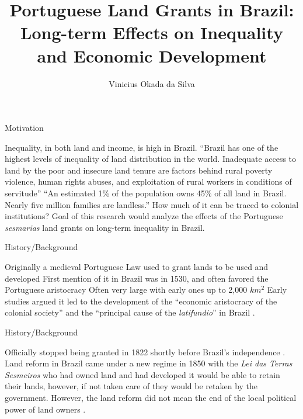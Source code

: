 \documentclass[aspectratio=1610, handout]{beamer}
\title{Portuguese Land Grants in Brazil: Long-term Effects on Inequality and Economic Development}
\author{Vinicius Okada da Silva}
\institute{The University of Illinois at Urbana-Champaign}
\date{}
\begin{document}
\begin{frame}
	\titlepage
\end{frame}

\begin{frame}{Motivation}
    \begin{outline}
        \1 Inequality, in both land and income, is high in Brazil.
            \2 ``Brazil has one of the highest levels of inequality of land distribution in the world. Inadequate access to land by the poor and insecure land tenure are factors behind rural poverty violence, human rights abuses, and exploitation of rural workers in conditions of servitude'' \parencite{Usaid2016-xs}
            \2 ``An estimated 1\% of the population owns 45\% of all land in Brazil. Nearly five million families are landless.'' \parencite{Usaid2016-xs}
        \pause 
        \1 How much of it can be traced to colonial institutions?
            \2 Goal of this research would analyze the effects of the Portuguese \textit{sesmarias} land grants on long-term inequality in Brazil.
    \end{outline}
\end{frame}

\begin{frame}{History/Background}
    \begin{outline}
        \1 Originally a medieval Portuguese Law used to grant lands to be used and developed \parencite[p.~16]{Diegues_Junior1959-ba}
        \1 First mention of it in Brazil was in 1530, and often favored the Portuguese aristocracy \parencites[p.~16]{Diegues_Junior1959-ba}{Lobb1976-mc}
            \2 Often very large with early ones up to 2,000 $km^2$ \parencite{Nozoe2006-hj}
            \2 Early studies argued it led to the development of the ``economic aristocracy of the colonial society'' and the ``principal cause of the \textit{latifundio}'' in Brazil \parencites[p.~36]{Lima2002-kd}[p.~48]{Da_Costa_Porto1979-dz}.
    \end{outline}
\end{frame}

\begin{frame}{History/Background}
    \begin{outline}
        \1 Officially stopped being granted in 1822 shortly before Brazil's independence \parencite{Silva2019-vj}. 
        \1 Land reform in Brazil came under a new regime in 1850 with the \textit{Lei das Terras} \parencite[p.~148]{Da_Costa_Porto1979-dz}
            \2 \textit{Sesmeiros} who had owned land and had developed it would be able to retain their lands, however, if not taken care of they would be retaken by the government.
            \2 However, the land reform did not mean the end of the local political power of land owners \parencite{Motta1998-xw}.
    \end{outline}    
\end{frame}
\end{document}
